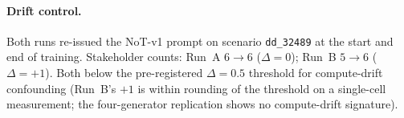 \documentclass[11pt]{article}
\begin{document}
\paragraph{Drift control.}
Both runs re-issued the NoT-v1 prompt on scenario \texttt{dd\_32489} at the start and end of training.
Stakeholder counts: Run~A $6 \to 6$ ($\Delta = 0$); Run~B $5 \to 6$ ($\Delta = +1$).
Both below the pre-registered $\Delta = 0.5$ threshold for compute-drift confounding (Run~B's $+1$ is within rounding of the threshold on a single-cell measurement; the four-generator replication shows no compute-drift signature).
\end{document}

